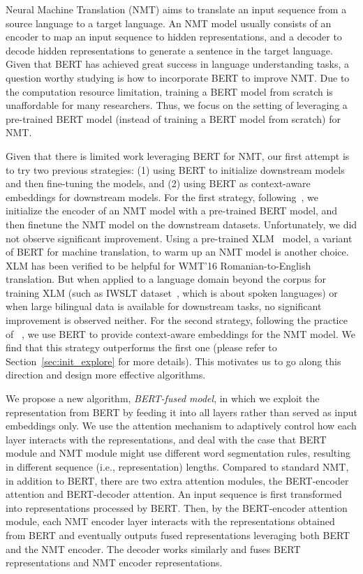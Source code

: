 \documentclass{article} \usepackage{iclr2020_conference,times}
\begin{document}
Neural Machine Translation (NMT) aims to translate an input sequence from a source language to a target language. An NMT model usually consists of an encoder to map an input sequence to hidden representations, and a decoder to decode hidden representations to generate a sentence in the target language. Given that BERT has achieved great success in language understanding tasks, a question worthy studying is how to incorporate BERT to improve NMT. Due to the computation resource limitation, training a BERT model from scratch is unaffordable for many researchers. Thus, we focus on the setting of leveraging a pre-trained BERT model (instead of training a BERT model from scratch) for NMT.

Given that there is limited work leveraging BERT for NMT, our first attempt is to try two previous strategies: (1) using BERT to initialize downstream models and then fine-tuning the models, and (2) using BERT as context-aware embeddings for downstream models. For the first strategy, following~\cite{devlin2018bert}, we initialize the encoder of an NMT model with a pre-trained BERT model, and then finetune the NMT model on the downstream datasets. Unfortunately, we did not observe significant improvement. Using a pre-trained XLM~\citep{lample2019cross} model, a variant of BERT for machine translation, to warm up an NMT model is another choice. XLM has been verified to be helpful for WMT'16 Romanian-to-English translation. But when applied to a language domain beyond the corpus for training XLM (such as IWSLT dataset~\citep{iwslt14}, which is about spoken languages) or when large bilingual data is available for downstream tasks, no significant improvement is observed neither. For the second strategy, following the practice of ~\citep{peters2018deep}, we use BERT to provide context-aware embeddings for the NMT model. We find that this strategy outperforms the first one (please refer to Section~\ref{sec:init_explore} for more details). This motivates us to go along this direction and design more effective algorithms. 

We propose a new algorithm, {\em BERT-fused model}, in which we exploit the representation from BERT by feeding it into all layers rather than served as input embeddings only. We use the attention mechanism to adaptively control how each layer interacts with the representations, and deal with the case that BERT module and NMT module might use different word segmentation rules, resulting in different sequence (i.e., representation) lengths. Compared to standard NMT, in addition to BERT, there are two extra attention modules, the BERT-encoder attention and BERT-decoder attention. An input sequence is first transformed into representations processed by BERT. Then, by the BERT-encoder attention module, each NMT encoder layer interacts with the representations obtained from BERT and eventually outputs fused representations leveraging both BERT and the NMT encoder. The decoder works similarly and fuses BERT representations and NMT encoder representations. 
\end{document}
